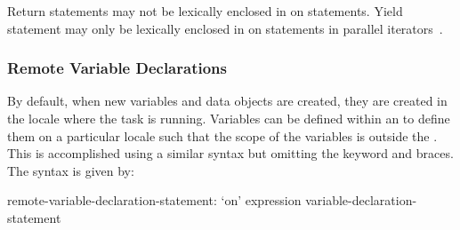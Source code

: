 Return statements may not be lexically enclosed in on statements.
Yield statement may only be lexically enclosed in on statements in
parallel iterators~.

\subsubsection{Remote Variable Declarations}
\label{remote_variable_declarations}

By default, when new variables and data objects are created, they are
created in the locale where the task is running.  Variables can be
defined within an  to define them on a particular
locale such that the scope of the variables is outside
the .  This is accomplished using a similar syntax
but omitting the  keyword and braces.  The syntax is given
by:
\begin{syntax}
remote-variable-declaration-statement:
  `on' expression variable-declaration-statement
\end{syntax}
